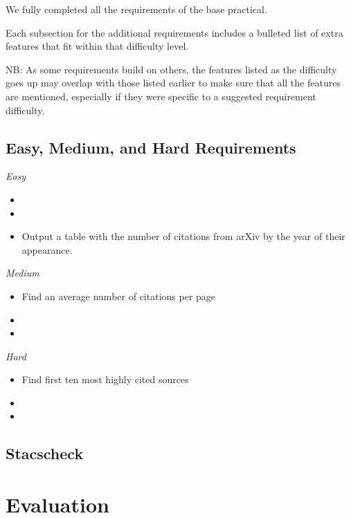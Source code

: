 \documentclass[12pt,a4paper,final]{article}
\begin{document}
We fully completed all the requirements of the base practical.

Each subsection for the additional requirements includes a bulleted list of
extra features that fit within that difficulty level.

NB: As some requirements build on others, the features listed as the difficulty goes
up may overlap with those listed earlier to make sure that all the features are mentioned,
especially if they were specific to a suggested requirement difficulty.

\subsection*{Easy, Medium, and Hard Requirements}
\begin{center} \emph{Easy} \end{center}
\begin{itemize}[noitemsep]
    \item
    \item
    \item Output a table with the number of citations from arXiv by the year of their appearance.
\end{itemize}

\begin{center} \emph{Medium} \end{center}
\begin{itemize}[noitemsep]
    \item Find an average number of citations per page
    \item
    \item
\end{itemize}

\begin{center} \emph{Hard} \end{center}
\begin{itemize}[noitemsep]
    \item Find first ten most highly cited sources
    \item
    \item
\end{itemize}

\subsection*{Stacscheck}

\section*{Evaluation}
\end{document}
